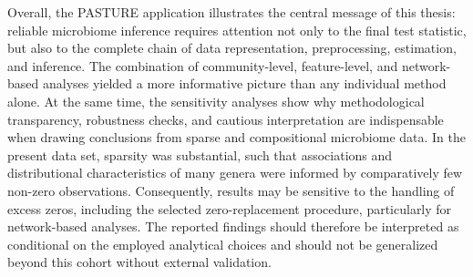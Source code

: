 Overall, the PASTURE application illustrates the central message of this thesis: reliable microbiome inference requires attention not only to the final test statistic, but also to the complete chain of data representation, preprocessing, estimation, and inference. The combination of community-level, feature-level, and network-based analyses yielded a more informative picture than any individual method alone. At the same time, the sensitivity analyses show why methodological transparency, robustness checks, and cautious interpretation are indispensable when drawing conclusions from sparse and compositional microbiome data. In the present data set, sparsity was substantial, such that associations and distributional characteristics of many genera were informed by comparatively few non-zero observations. Consequently, results may be sensitive to the handling of excess zeros, including the selected zero-replacement procedure, particularly for network-based analyses. The reported findings should therefore be interpreted as conditional on the employed analytical choices and should not be generalized beyond this cohort without external validation.
